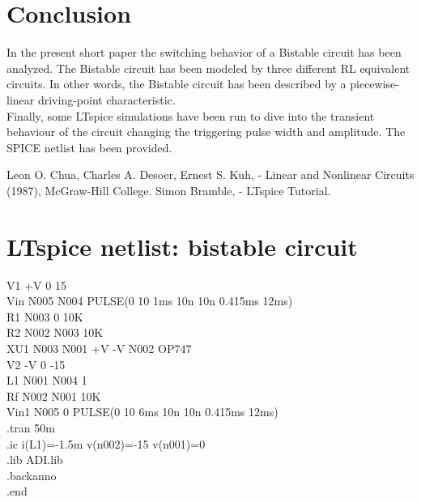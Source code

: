 \documentclass[12pt,a4paper,tweside,onehalfspacing]{article}
\begin{document}
\section{Conclusion}
%
In the present short paper the switching behavior of a Bistable circuit has been analyzed. The Bistable circuit has been modeled by three different RL equivalent circuits. In other words, the Bistable circuit has been described by a piecewise-linear driving-point characteristic.\\
Finally, some LTspice simulations have been run to dive into the transient behaviour of the circuit changing the triggering pulse width and amplitude. The SPICE netlist has been provided.
%
\begin{thebibliography}{99}
Leon O. Chua, Charles A. Desoer, Ernest S. Kuh, - Linear and Nonlinear Circuits (1987), McGraw-Hill College.
Simon Bramble, - LTspice Tutorial.
\end{thebibliography}

%
%
\clearpage
%
\appendix
%
\section{LTspice netlist: bistable circuit}
V1 +V 0 15\\
Vin N005 N004 PULSE(0 10 1ms 10n 10n 0.415ms 12ms)\\
R1 N003 0 10K\\
R2 N002 N003 10K\\
XU1 N003 N001 +V -V N002 OP747\\
V2 -V 0 -15\\
L1 N001 N004 1\\
Rf N002 N001 10K\\
Vin1 N005 0 PULSE(0 10 6ms 10n 10n 0.415ms 12ms)\\
.tran 50m\\
.ic i(L1)=-1.5m v(n002)=-15 v(n001)=0\\
.lib ADI.lib\\
.backanno\\
.end\\
\end{document}
